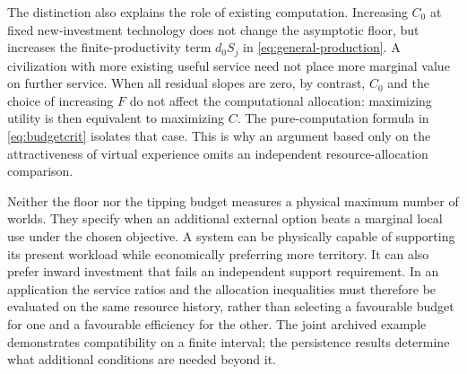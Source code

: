 The distinction also explains the role of existing computation. Increasing
$C_0$ at fixed new-investment technology does not change the asymptotic
floor, but increases the finite-productivity term $d_0S_j$ in
\cref{eq:general-production}. A civilization with more existing useful
service need not place more marginal value on further service. When all
residual slopes are zero, by contrast, $C_0$ and the choice of increasing
$F$ do not affect the computational allocation: maximizing utility is
then equivalent to maximizing $C$. The pure-computation formula in
\cref{eq:budgetcrit} isolates that case. This is why an argument based
only on the attractiveness of virtual experience omits an independent
resource-allocation comparison.

Neither the floor nor the tipping budget measures a physical maximum
number of worlds. They specify when an additional external option beats
a marginal local use under the chosen objective. A system can be physically
capable of supporting its present workload while economically preferring
more territory. It can also prefer inward investment that fails an
independent support requirement. In an application the service ratios and
the allocation inequalities must therefore be evaluated on the same
resource history, rather than selecting a favourable budget for one and a
favourable efficiency for the other. The joint archived example demonstrates
compatibility on a finite interval; the persistence results determine what
additional conditions are needed beyond it.

